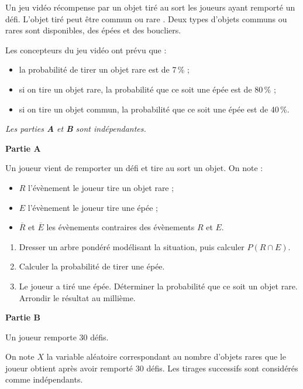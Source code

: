 \medskip

Un jeu vidéo récompense par un objet tiré au sort les joueurs ayant remporté un défi. L'objet tiré peut être \og commun \fg{} ou \og rare \fg. Deux types d'objets communs ou rares sont disponibles, des épées et des boucliers.

Les concepteurs du jeu vidéo ont prévu que :

\begin{itemize}
\item la probabilité de tirer un objet rare est de 7\,\% ;
\item si on tire un objet rare, la probabilité que ce soit une épée est de 80\,\% ;
\item si on tire un objet commun, la probabilité que ce soit une épée est de 40\,\%.
\end{itemize}

\emph{Les parties \textbf{\rm A} et \textbf{\rm B} sont indépendantes.}

\bigskip

\textbf{Partie A}

\medskip

Un joueur vient de remporter un défi et tire au sort un objet. On note :

\begin{itemize}[label=$\bullet~$]
\item $R$ l'évènement \og le joueur tire un objet rare\fg{} ;
\item $E$ l'évènement \og le joueur tire une épée \fg{} ;
\item $\overline{R}$ et $\overline{E}$ les évènements contraires des évènements $R$ et $E$.
\end{itemize}

\medskip

\begin{enumerate}
\item Dresser un arbre pondéré modélisant la situation, puis calculer $P(R \cap E)$.
\item Calculer la probabilité de tirer une épée.
\item Le joueur a tiré une épée. Déterminer la probabilité que ce soit un objet rare. Arrondir
le résultat au millième.
\end{enumerate}

\bigskip

\textbf{Partie B}

\medskip

Un joueur remporte $30$ défis.

On note $X$ la variable aléatoire correspondant au nombre d'objets rares que le joueur obtient après avoir remporté $30$ défis. Les tirages successifs sont considérés comme indépendants.

